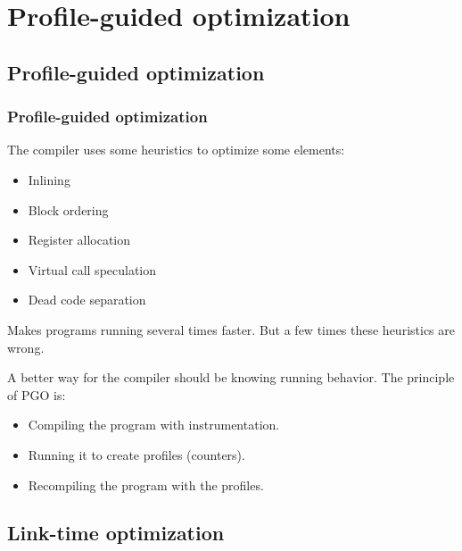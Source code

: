 \documentclass{beamer}
\begin{document}
\section{Profile-guided optimization}

    \begin{frame}
        \tableofcontents[currentsection]
    \end{frame}

    \subsection{Profile-guided optimization}

    \begin{frame}
        \frametitle{Profile-guided optimization}

        The compiler uses some heuristics to optimize some elements:
        \begin{itemize}
            \item Inlining
            \item Block ordering
            \item Register allocation
            \item Virtual call speculation
            \item Dead code separation
        \end{itemize}
        Makes programs running several times faster.
        But a few times these heuristics are wrong.
    \end{frame}


    \begin{frame}
        A better way for the compiler should be knowing running behavior.
        The principle of PGO is:
        \begin{itemize}
            \item Compiling the program with instrumentation.
            \item Running it to create profiles (counters).
            \item Recompiling the program with the profiles.
        \end{itemize}
    \end{frame}
    \subsection{Link-time optimization}
\end{document}
